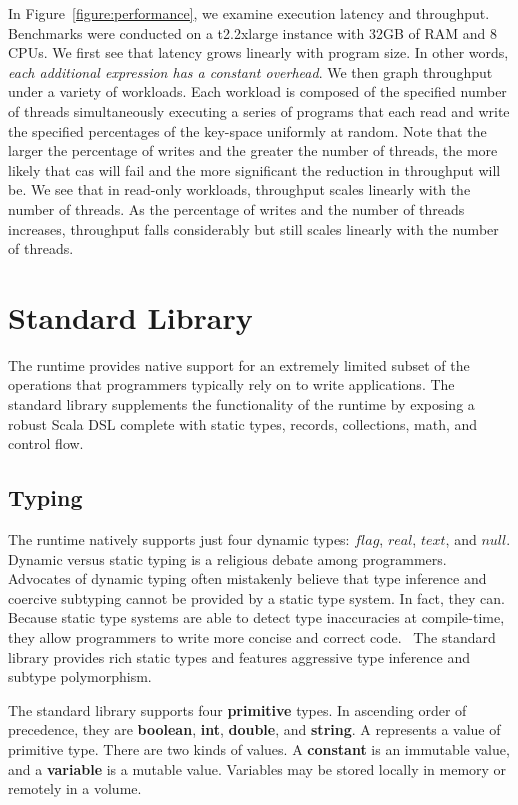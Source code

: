 \documentclass[../main.tex]{subfiles}
\begin{document}
  In Figure~\ref{figure:performance}, we examine execution latency and throughput. Benchmarks were
  conducted on a t2.2xlarge instance with 32GB of RAM and 8 CPUs. We first see that latency
  grows linearly with program size. In other words, \emph{each additional expression has a constant
  overhead}. We then graph throughput under a variety of workloads. Each workload is composed of the
  specified number of threads simultaneously executing a series of programs that each read and write
  the specified percentages of the key-space uniformly at random. Note that the larger the
  percentage of writes and the greater the number of threads, the more likely that cas
  will fail and the more significant the reduction in throughput will be. We see that in read-only
  workloads, throughput scales linearly with the number of threads. As the percentage of writes and
  the number of threads increases, throughput falls considerably but still scales linearly with the
  number of threads.

\section{Standard Library}
The runtime provides native support for an extremely limited subset of the operations that
programmers typically rely on to write applications. The standard library supplements the
functionality of the runtime by exposing a robust Scala DSL complete with static types, records,
collections, math, and control flow.

  \subsection{Typing}
  The runtime natively supports just four dynamic types: $flag$, $real$, $text$, and $null$.
  Dynamic versus static typing is a religious debate among programmers. Advocates of dynamic
  typing often mistakenly believe that type inference and coercive subtyping cannot be provided by
  a static type system. In fact, they can. Because static type systems are able to
  detect type inaccuracies at compile-time, they allow programmers to write more concise and
  correct code.~\cite{typing} The standard library provides rich static types and features
  aggressive type inference and subtype polymorphism.

  The standard library supports four \textbf{primitive} types. In ascending order of precedence,
  they are \textbf{boolean}, \textbf{int}, \textbf{double}, and \textbf{string}. A 
  represents a value of primitive type. There are two kinds of values. A \textbf{constant} is an
  immutable value, and a \textbf{variable} is a mutable value. Variables may be stored locally in
  memory or remotely in a volume.
\end{document}

